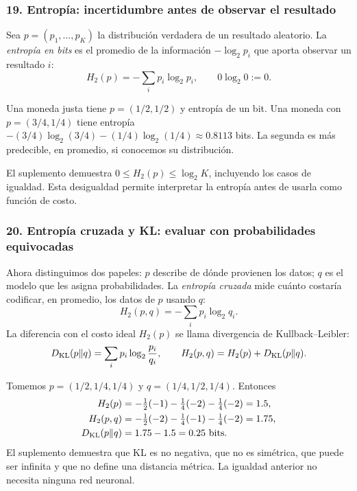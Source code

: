 \subsubsection*{19. Entropía: incertidumbre antes de observar el resultado}
Sea $p=(p_1,\ldots,p_K)$ la distribución verdadera de un resultado aleatorio. La \emph{entropía en bits} es el promedio de la información $-\log_2p_i$ que aporta observar un resultado $i$:
\[
H_2(p)=-\sum_i p_i\log_2p_i,\qquad 0\log_2 0:=0.
\]
\begin{ejemplo}
Una moneda justa tiene $p=(1/2,1/2)$ y entropía de un bit. Una moneda con $p=(3/4,1/4)$ tiene entropía
$-(3/4)\log_2(3/4)-(1/4)\log_2(1/4)\approx0.8113$ bits. La segunda es más predecible, en promedio, si conocemos su distribución.
\end{ejemplo}
El suplemento demuestra $0\le H_2(p)\le\log_2K$, incluyendo los casos de igualdad. Esta desigualdad permite interpretar la entropía antes de usarla como función de costo.

\subsubsection*{20. Entropía cruzada y KL: evaluar con probabilidades equivocadas}
Ahora distinguimos dos papeles: $p$ describe de dónde provienen los datos; $q$ es el modelo que les asigna probabilidades. La \emph{entropía cruzada} mide cuánto costaría codificar, en promedio, los datos de $p$ usando $q$:
\[
H_2(p,q)=-\sum_i p_i\log_2q_i.
\]
La diferencia con el costo ideal $H_2(p)$ se llama divergencia de Kullback--Leibler:
\[
D_{\rm KL}(p\|q)=\sum_i p_i\log_2\frac{p_i}{q_i},
\qquad H_2(p,q)=H_2(p)+D_{\rm KL}(p\|q).
\]
\begin{ejemplo}
Tomemos $p=(1/2,1/4,1/4)$ y $q=(1/4,1/2,1/4)$. Entonces
\begin{align*}
H_2(p)&=-\tfrac12(-1)-\tfrac14(-2)-\tfrac14(-2)=1.5,\\
H_2(p,q)&=-\tfrac12(-2)-\tfrac14(-1)-\tfrac14(-2)=1.75,\\
D_{\rm KL}(p\|q)&=1.75-1.5=0.25\ \text{bits}.
\end{align*}
El suplemento demuestra que KL es no negativa, que no es simétrica, que puede ser infinita y que no define una distancia métrica. La igualdad anterior no necesita ninguna red neuronal.
\end{ejemplo}

